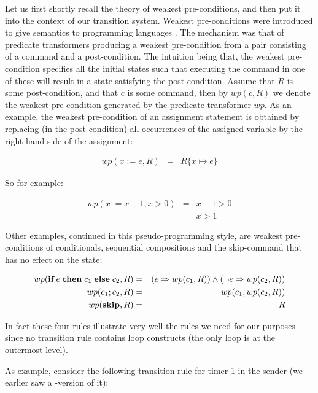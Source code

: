 Let us  first shortly recall the theory  of weakest pre-conditions, and
then  put  it  into  the context of   our transition  system.  Weakest
pre-conditions  were  introduced  to  give  semantics  to  programming
languages \cite{Dij:Discipline}.  The  mechanism was that of predicate
transformers producing a  weakest pre-condition from a pair consisting
of a   command and a  post-condition.  The   intuition being that, the
weakest pre-condition  specifies   all the initial  states   such that
executing the command in one of these will result in a state satisfying
the  post-condition. Assume that $R$ is  some post-condition, and
that $c$   is some command, then  by  $wp(c,R)$ we  denote the
weakest pre-condition generated by the predicate transformer $wp$.
As an example, the weakest  pre-condition of an assignment statement is
obtained by  replacing (in the post-condition)  all occurrences  of the
assigned variable by the right hand side of the assignment:

\begin{eqnarray*}
  wp(x := e,R) &=& R\{x \mapsto e\}
\end{eqnarray*}

\noindent So for example:

\begin{eqnarray*}
  wp(x := x-1,x > 0)  &=&  x-1 > 0\\
                      &=&  x > 1
\end{eqnarray*}

Other  examples,   continued in   this  pseudo-programming  style, are
weakest pre-conditions of conditionals, sequential compositions and the
skip-command that has no effect on the state:

\begin{eqnarray*}
  wp(\mbox{\bf if}\; e \;\mbox{\bf then}\; c_1 
                       \;\mbox{\bf else}\; c_2,R) &=& 
    (e \Rightarrow wp(c_1,R)) \wedge (\neg e \Rightarrow wp(c_2,R))\\
  wp(c_1;c_2,R) &=& wp(c_1,wp(c_2,R))\\
  wp(\mbox{\bf skip},R) &=& R
\end{eqnarray*}

In fact  these four rules illustrate very  well the rules we  need for
our  purposes since no transition rule   contains loop constructs (the
only  loop is at the outermost  level).   

As example, consider the following transition  rule for timer 1 in the
sender (we earlier saw a \Murphi{}-version of it):

